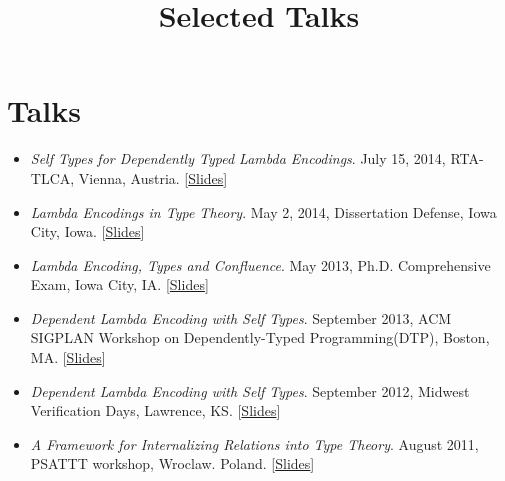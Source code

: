\documentclass[10pt]{article}
\title{\bfseries\Large Selected Talks}
\date{}
\begin{document}
\maketitle
\vspace{-4em}

\vspace{20pt}
\section*{Talks}
\begin{itemize}
\item \textit{Self Types for Dependently Typed Lambda Encodings}. July 15, 2014, RTA-TLCA, Vienna, Austria. [\href{../../document/talks/tlca-rta-14.pdf}{Slides}]
\item \textit{Lambda Encodings in Type Theory}. May 2, 2014, Dissertation Defense, Iowa City, Iowa. [\href{../../document/talks/thesis-talk.pdf}{Slides}]
\item \textit{Lambda Encoding, Types and Confluence}. May 2013, Ph.D. Comprehensive Exam, Iowa City, IA. [\href{../../document/talks/comp.pdf}{Slides}]
\item \textit{Dependent Lambda Encoding with Self Types}. September 2013, ACM SIGPLAN Workshop on Dependently-Typed Programming(DTP), Boston, MA. [\href{../../document/talks/dtp-2013.pdf}{Slides}]
\item \textit{Dependent Lambda Encoding with Self Types}. September 2012, Midwest Verification Days, Lawrence, KS. [\href{../../document/talks/mvd-2012.pdf}{Slides}]

\item \textit{A Framework for Internalizing Relations into Type Theory}. August 2011, PSATTT workshop, Wroclaw. Poland. [\href{../../document/talks/psattt11-talk.pdf}{Slides}]
\end{itemize}
\end{document}
